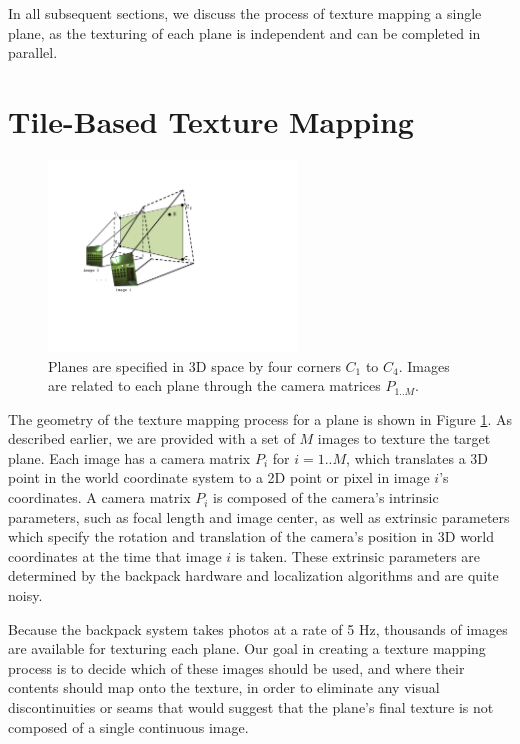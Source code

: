 \message{ !name(oldpaper.tex)}\documentclass[10pt,twocolumn,letterpaper]{article}
\begin{document}
In all subsequent sections, we discuss the process of texture mapping
a single plane, as the texturing of each plane is independent and can
be completed in parallel.

\section{Tile-Based Texture Mapping}
\label{sec:simpleTextureMapping}
\begin{figure}
  \centering
  \includegraphics[height=2in]{Projection.pdf}
  \caption{Planes are specified in 3D space by four corners $C_1$ to
    $C_4$. Images are related to each plane through the camera
    matrices $P_{1..M}$. }
  \label{fig:projection}
\end{figure}

The geometry of the texture mapping process for a plane is shown in
Figure \ref{fig:projection}.  As described earlier, we are provided
with a set of $M$ images to texture the target plane. Each image has a
camera matrix $P_i$ for $i=1..M$, which translates a 3D point in the
world coordinate system to a 2D point or pixel in image $i$'s
coordinates. A camera matrix $P_i$ is composed of the camera's
intrinsic parameters, such as focal length and image center, as well
as extrinsic parameters which specify the rotation and translation of
the camera's position in 3D world coordinates at the time that image
$i$ is taken. These extrinsic parameters are determined by the
backpack hardware and localization algorithms \cite{chen2010indoor,
  liu2010indoor, kua2012loopclosure} and are quite noisy.

Because the backpack system takes photos at a rate of 5 Hz, thousands
of images are available for texturing each plane. Our goal in creating
a texture mapping process is to decide which of these images should be
used, and where their contents should map onto the texture, in order
to eliminate any visual discontinuities or seams that would suggest
that the plane's final texture is not composed of a single continuous
image.
\end{document}

